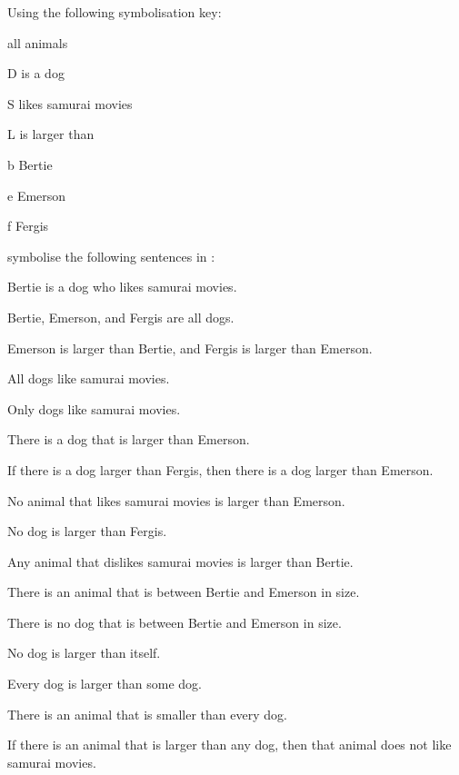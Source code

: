 \problempart 
Using the following symbolisation key:
\begin{ekey}
\item[\text{domain}] all animals
\item[D]  is a dog
\item[S]  likes samurai movies
\item[L]  is larger than 
\item[b] Bertie
\item[e] Emerson
\item[f] Fergis
\end{ekey}
symbolise the following sentences in \FOL:
\begin{earg}
\item Bertie is a dog who likes samurai movies.
\item Bertie, Emerson, and Fergis are all dogs.
\item Emerson is larger than Bertie, and Fergis is larger than Emerson.
\item All dogs like samurai movies.
\item Only dogs like samurai movies.
\item There is a dog that is larger than Emerson.
\item If there is a dog larger than Fergis, then there is a dog larger than Emerson.
\item No animal that likes samurai movies is larger than Emerson.
\item No dog is larger than Fergis.
\item Any animal that dislikes samurai movies is larger than Bertie.
\item There is an animal that is between Bertie and Emerson in size.
\item There is no dog that is between Bertie and Emerson in size.
\item No dog is larger than itself.
\item Every dog is larger than some dog.
\item There is an animal that is smaller than every dog.
\item If there is an animal that is larger than any dog, then that animal does not like samurai movies.
\end{earg}

